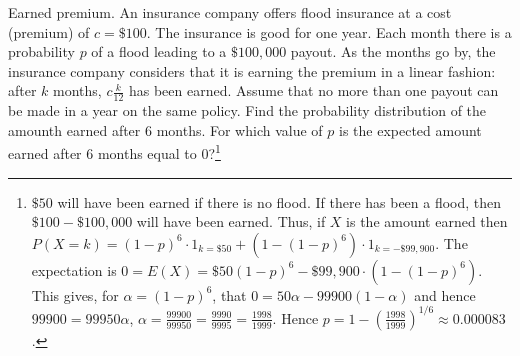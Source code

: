 \begin{example}{Earned premium.}\label{drc}
	An insurance company offers flood insurance at a cost (premium) of $c=\$100$.
	The insurance is good for one year. Each month there is a probability $p$ of a flood leading to a $\$100,000$ payout.
	As the months go by, the insurance company considers that it is earning the premium in a linear fashion:
	after $k$ months, $c\frac{k}{12}$ has been earned.
	Assume that no more than one payout can be made in a year on the same policy.
	Find the probability distribution of the amounth earned after 6 months.
	For which value of $p$ is the expected amount earned after 6 months equal to 0?\footnote{
		$\$50$ will have been earned if there is no flood.
		If there has been a flood, then $\$100-\$100,000$ will have been earned.
		Thus, if $X$ is the amount earned then
		$P(X=k)=(1-p)^6\cdot 1_{k=\$50} + (1-(1-p)^6)\cdot 1_{k=-\$99,900}$.
		The expectation is $0=E(X)=\$50 (1-p)^6 - \$99,900\cdot (1-(1-p)^6)$.
		This gives, for $\alpha=(1-p)^6$, that $0=50\alpha-99900(1-\alpha)$ and hence
		$99900=99950\alpha$, $\alpha=\frac{99900}{99950}=\frac{9990}{9995}=\frac{1998}{1999}$.
		Hence $p=1-\left(\frac{1998}{1999}\right)^{1/6}\approx 0.000083$.
	}
\end{example}

